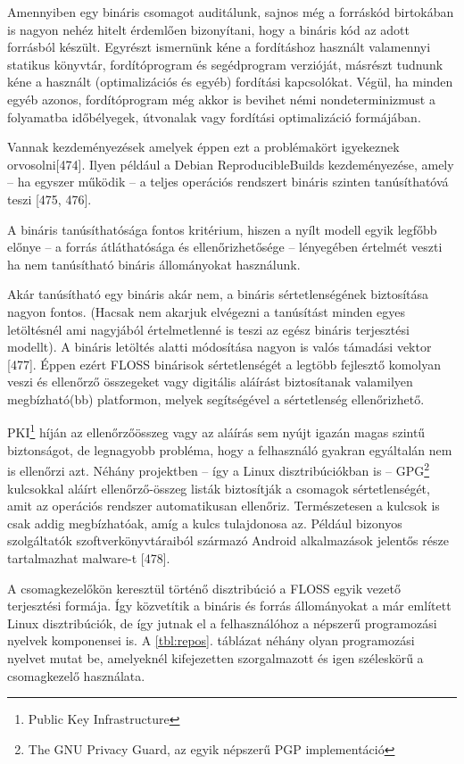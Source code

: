 \documentclass[12pt,magyar,a4paper,oneside]{scrreprt}
\begin{document}
Amennyiben egy bináris csomagot auditálunk, sajnos még a forráskód
birtokában is nagyon nehéz hitelt érdemlően bizonyítani, hogy a bináris
kód az adott forrásból készült. Egyrészt ismernünk kéne a fordításhoz
használt valamennyi statikus könyvtár, fordítóprogram és segédprogram
verzióját, másrészt tudnunk kéne a használt (optimalizációs és egyéb)
fordítási kapcsolókat. Végül, ha minden egyéb azonos, fordítóprogram még
akkor is bevihet némi nondeterminizmust a folyamatba időbélyegek,
útvonalak vagy fordítási optimalizáció formájában.

Vannak kezdeményezések amelyek éppen ezt a problémakört igyekeznek
orvosolni{[}474{]}. Ilyen például a Debian ReproducibleBuilds
kezdeményezése, amely -- ha egyszer működik -- a teljes operációs
rendszert bináris szinten tanúsíthatóvá teszi {[}475, 476{]}.

A bináris tanúsíthatósága fontos kritérium, hiszen a nyílt modell egyik
legfőbb előnye -- a forrás átláthatósága és ellenőrizhetősége --
lényegében értelmét veszti ha nem tanúsítható bináris állományokat
használunk.

Akár tanúsítható egy bináris akár nem, a bináris sértetlenségének
biztosítása nagyon fontos. (Hacsak nem akarjuk elvégezni a tanúsítást
minden egyes letöltésnél ami nagyjából értelmetlenné is teszi az egész
bináris terjesztési modellt). A bináris letöltés alatti módosítása
nagyon is valós támadási vektor {[}477{]}. Éppen ezért FLOSS binárisok
sértetlenségét a legtöbb fejlesztő komolyan veszi és ellenőrző
összegeket vagy digitális aláírást biztosítanak valamilyen
megbízható(bb) platformon, melyek segítségével a sértetlenség
ellenőrizhető.

PKI\footnote{Public Key Infrastructure} híján az ellenőrzőösszeg vagy az
aláírás sem nyújt igazán magas szintű biztonságot, de legnagyobb
probléma, hogy a felhasználó gyakran egyáltalán nem is ellenőrzi azt.
Néhány projektben -- így a Linux disztribúciókban is -- GPG\footnote{The
  GNU Privacy Guard, az egyik népszerű PGP implementáció} kulcsokkal
aláírt ellenőrző-összeg listák biztosítják a csomagok sértetlenségét,
amit az operációs rendszer automatikusan ellenőriz. Természetesen a
kulcsok is csak addig megbízhatóak, amíg a kulcs tulajdonosa az. Például
bizonyos szolgáltatók szoftverkönyvtáraiból származó Android
alkalmazások jelentős része tartalmazhat malware-t {[}478{]}.

A csomagkezelőkön keresztül történő disztribúció a FLOSS egyik vezető
terjesztési formája. Így közvetítik a bináris és forrás állományokat a
már említett Linux disztribúciók, de így jutnak el a felhasználóhoz a
népszerű programozási nyelvek komponensei is. A \ref{tbl:repos}.
táblázat néhány olyan programozási nyelvet mutat be, amelyeknél
kifejezetten szorgalmazott és igen széleskörű a csomagkezelő használata.
\end{document}
